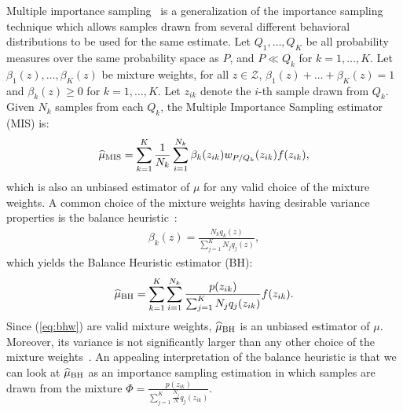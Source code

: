 \documentclass{article}
\begin{document}
Multiple importance sampling~\citep{veach_optimally_1995} is a generalization of the importance sampling technique which allows samples drawn from several different behavioral distributions to be used for the same estimate.
Let $Q_1,\dots,Q_K$ be all probability measures over the same probability space as $P$, and $P\ll Q_k$ for $k=1,\dots,K$. Let $\beta_1(z),\dots,\beta_K(z)$ be mixture weights, \ie for all $z\in\mathcal{Z}$, ${\beta_1(z)+\dots+\beta_K(z) = 1}$ and $\beta_k(z)\geq0$ for ${k=1,\dots,K}$. Let $z_{ik}$ denote the $i$-th sample drawn from $Q_k$. Given $N_k$ \iid samples from each $Q_k$, the Multiple Importance Sampling estimator (MIS) is:
\begin{align}\label{eq:mise}
	\widehat{\mu}_{\text{MIS}} = \sum_{k=1}^K\frac{1}{N_k}\sum_{i=1}^{N_k}\beta_k(z_{ik})w_{P/Q_k}(z_{ik})f(z_{ik}),
\end{align}
which is also an unbiased estimator of $\mu$ for any valid choice of the mixture weights. A common choice of the mixture weights having desirable variance properties is the balance heuristic~\citep{veach_optimally_1995}: 
\begin{align}\label{eq:bhw}
	\beta_k(z) = \frac{N_kq_k(z)}{\sum_{j=1}^{K}N_jq_j(z)},
\end{align}
which yields the Balance Heuristic estimator (BH):
\begin{align}\label{eq:bhe}
	\widehat{\mu}_{\text{BH}} = \sum_{k=1}^K\sum_{i=1}^{N_k}\frac{p(z_{ik})}{\sum_{j=1}^K N_jq_j(z_{ik})}f(z_{ik}).
\end{align}
Since (\ref{eq:bhw}) are valid mixture weights, $\widehat{\mu}_{\text{BH}}$ is an unbiased estimator of $\mu$. Moreover, its variance is not significantly larger than any other choice of the mixture weights~\citep[][Theorem 1]{veach_optimally_1995}. An appealing interpretation of the balance heuristic is that we can look at $\widehat{\mu}_{\text{BH}}$ as an importance sampling estimation in which samples are drawn from the mixture $\Phi = \frac{p(z_{ik})}{\sum_{j=1}^K \frac{N_j}{N}q_j(z_{ik})}$.
\end{document}
